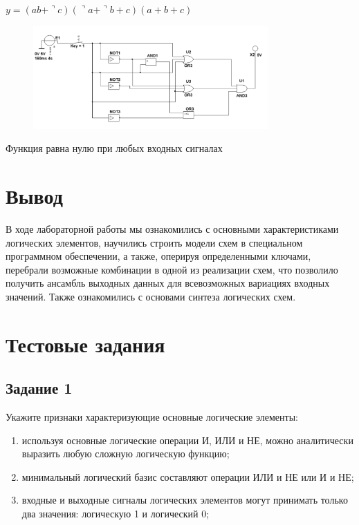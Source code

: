 \documentclass[bachelor, och, labwork]{shiza}
\begin{document}
\begin{center}$y=(ab+\urcorner c)(\urcorner a+\urcorner b+c)(a+b+c)$\end{center}

\begin{figure}[H]
    \centering
    \includegraphics[width=0.8\textwidth]{pic1/2.png}
    \caption{}
\end{figure}

Функция равна нулю при любых входных сигналах

\section{Вывод}
В ходе лабораторной работы мы ознакомились с основными характеристиками логических
элементов, научились строить модели схем в специальном программном обеспечении,
а также, оперируя определенными ключами, перебрали возможные комбинации в
одной из реализации схем, что позволило получить ансамбль выходных данных
для всевозможных вариациях входных значений. Также ознакомились с основами
синтеза логических схем.

\section{Тестовые задания}

\subsection{Задание 1}
    Укажите признаки характеризующие основные логические элементы:
    
    \begin{enumerate}
        \item используя основные логические операции И, ИЛИ и НЕ, можно аналитически
        выразить любую сложную логическую функцию;
        \item минимальный логический базис составляют операции ИЛИ и НЕ или И и НЕ;
        \item входные и выходные сигналы логических элементов могут принимать
        только два значения: логическую 1 и логический 0;
    \end{enumerate}
\end{document}

